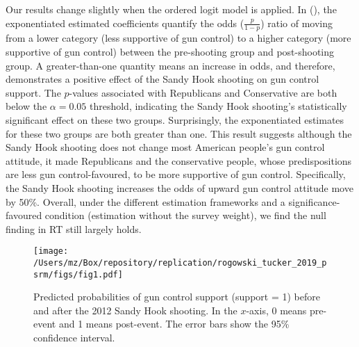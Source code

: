 \documentclass[11pt]{article}
\begin{document}
Our results change slightly when the ordered logit model is applied. In (), the exponentiated estimated coefficients quantify the odds (\(\frac{p}{1-p}\)) ratio of moving from a lower category (less supportive of gun control) to a higher category (more supportive of gun control) between the pre-shooting group and post-shooting group. A greater-than-one quantity means an increase in odds, and therefore, demonstrates a positive effect of the Sandy Hook shooting on gun control support. The \(p\)-values associated with Republicans and Conservative are both below the \(\alpha = 0.05\) threshold, indicating the Sandy Hook shooting’s statistically significant effect on these two groups. Surprisingly, the exponentiated estimates for these two groups are both greater than one. This result suggests although the Sandy Hook shooting does not change most American people’s gun control attitude, it made Republicans and the conservative people, whose predispositions are less gun control-favoured, to be more supportive of gun control. Specifically, the Sandy Hook shooting increases the odds of upward gun control attitude move by 50\%. Overall, under the different estimation frameworks and a significance-favoured condition (estimation without the survey weight), we find the null finding in RT still largely holds. 
\begin{figure}[htbp!]
\centering
\texttt{[image: /Users/mz/Box/repository/replication/rogowski\_tucker\_2019\_psrm/figs/fig1.pdf]}
\captionsetup{justification = raggedright, singlelinecheck = false}
\caption{Predicted probabilities of gun control support (support = 1) before and after the 2012 Sandy Hook shooting. In the \(x\)-axis, 0 means pre-event and 1 means post-event. The error bars show the 95\% confidence interval.}\label{fig1}
\end{figure}

\end{document}
